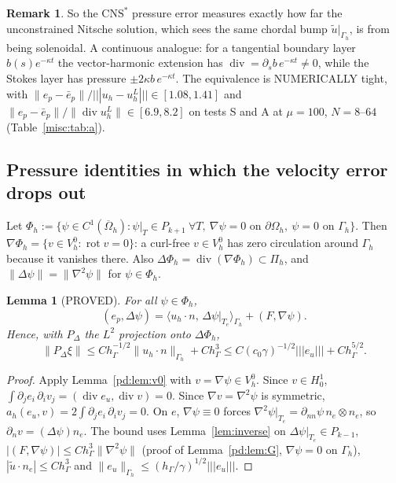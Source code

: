 \documentclass[11pt,reqno]{amsart}
\theoremstyle{plain}
\newtheorem{lemma}[theorem]{Lemma}
\theoremstyle{definition}
\newtheorem{remark}[theorem]{Remark}
\newcommand{\hG}{h_\Gamma}
\newcommand{\Gh}{\Gamma_h}
\newcommand{\Oh}{\Omega_h}
\newcommand{\VO}{V_h^0}
\newcommand{\Pih}{\Pi_h}
\newcommand{\dn}{\partial_n}
\newcommand{\ut}{\tilde u}
\newcommand{\ip}[2]{\langle #1,\, #2\rangle}
\newcommand{\tnorm}[1]{|\!|\!|#1|\!|\!|}
\newcommand{\norm}[1]{\lVert #1\rVert}
\newcommand{\CNS}{\mathrm{CNS}^\ast}
\renewcommand{\div}{\operatorname{div}}
\DeclareMathOperator{\rot}{rot}
\newcommand{\Phih}{\Phi_h}        %
\begin{document}
\begin{remark}
So the $\CNS$ pressure error measures exactly how far the unconstrained Nitsche solution, which sees the same chordal bump $\ut|_{\Gh}$, is from being solenoidal. A continuous analogue: for a tangential boundary layer $b(s)e^{-\kappa t}$ the vector-harmonic extension has $\div=\partial_sb\,e^{-\kappa t}\neq0$, while the Stokes layer has pressure $\pm2\kappa b\,e^{-\kappa t}$. The equivalence is NUMERICALLY tight, with $\norm{e_p-\bar e_p}/\tnorm{u_h-u_h^L}\in[1.08,1.41]$ and $\norm{e_p-\bar e_p}/\norm{\div u_h^L}\in[6.9,8.2]$ on tests S and A at $\mu=100$, $N=8$--$64$ (Table~\ref{misc:tab:a}).
\end{remark}

\subsection{Pressure identities in which the velocity error drops out}

Let $\Phih:=\{\psi\in C^1(\overline\Oh):\psi|_T\in P_{k+1}\ \forall T,\ \nabla\psi=0\text{ on }\partial\Oh,\ \psi=0\text{ on }\Gh\}$. Then $\nabla\Phih=\{v\in\VO:\rot v=0\}$: a curl-free $v\in\VO$ has zero circulation around $\Gh$ because it vanishes there. Also $\Delta\Phih=\div(\nabla\Phih)\subset\Pih$, and $\norm{\Delta\psi}=\norm{\nabla^2\psi}$ for $\psi\in\Phih$.

\begin{lemma}[PROVED]\label{misc:lem:A2}
For all $\psi\in\Phih$,
\[
(e_p,\Delta\psi)=\ip{u_h\cdot n}{\Delta\psi|_{T_e}}_{\Gh}+(F,\nabla\psi).
\]
Hence, with $P_\Delta$ the $L^2$ projection onto $\Delta\Phih$,
\[
\norm{P_\Delta\xi}\le C\hG^{-1/2}\norm{u_h\cdot n}_{\Gh}+C\hG^3\le C(c_0\gamma)^{-1/2}\tnorm{e_u}+C\hG^{5/2}.
\]
\end{lemma}

\begin{proof}
Apply Lemma~\ref{pd:lem:v0} with $v=\nabla\psi\in\VO$. Since $v\in H^1_0$, $\int\partial_je_i\,\partial_iv_j=(\div e_u,\div v)=0$. Since $\nabla v=\nabla^2\psi$ is symmetric, $a_h(e_u,v)=2\int\partial_je_i\,\partial_iv_j=0$. On $e$, $\nabla\psi\equiv0$ forces $\nabla^2\psi|_{T_e}=\partial_{nn}\psi\,n_e\otimes n_e$, so $\dn v=(\Delta\psi)n_e$. The bound uses Lemma~\ref{lem:inverse} on $\Delta\psi|_{T_e}\in P_{k-1}$, $|(F,\nabla\psi)|\le C\hG^3\norm{\nabla^2\psi}$ (proof of Lemma~\ref{pd:lem:G}, $\nabla\psi=0$ on $\Gh$), $|\ut\cdot n_e|\le C\hG^3$ and $\norm{e_u}_{\Gh}\le(\hG/\gamma)^{1/2}\tnorm{e_u}$.
\end{proof}
\end{document}
